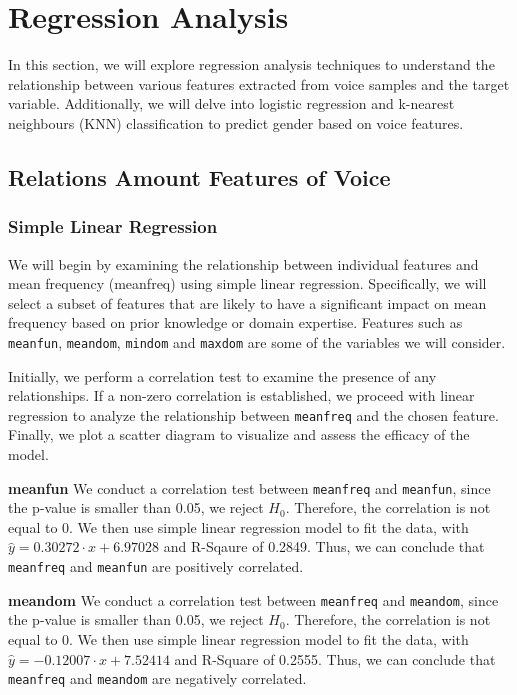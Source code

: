 \documentclass{article}
\begin{document}
	\section{Regression Analysis}
	
	In this section, we will explore regression analysis techniques to understand the relationship between various features extracted from voice samples and the target variable. Additionally, we will delve into logistic regression and k-nearest neighbours (KNN) classification to predict gender based on voice features.
	
	\subsection{Relations Amount Features of Voice}
	
	\subsubsection{Simple Linear Regression}
	We will begin by examining the relationship between individual features and mean frequency (meanfreq) using simple linear regression. Specifically, we will select a subset of features that are likely to have a significant impact on mean frequency based on prior knowledge or domain expertise. Features such as \texttt{meanfun}, \texttt{meandom}, \texttt{mindom} and \texttt{maxdom} are some of the variables we will consider.
	
	Initially, we perform a correlation test to examine the presence of any relationships. If a non-zero correlation is established, we proceed with linear regression to analyze the relationship between \texttt{meanfreq} and the chosen feature. Finally, we plot a scatter diagram to visualize and assess the efficacy of the model.
	
	\textbf{meanfun} We conduct a correlation test between \texttt{meanfreq} and \texttt{meanfun}, since the p-value is smaller than 0.05, we reject $H_0$. Therefore, the correlation is not equal to 0. We then use simple linear regression model to fit the data, with $\hat{y}=0.30272\cdot x + 6.97028$ and R-Sqaure of 0.2849. Thus, we can conclude that \texttt{meanfreq} and \texttt{meanfun} are positively correlated.
	
	\textbf{meandom} We conduct a correlation test between \texttt{meanfreq} and \texttt{meandom}, since the p-value is smaller than 0.05, we reject $H_0$. Therefore, the correlation is not equal to 0. We then use simple linear regression model to fit the data, with $\hat{y}=-0.12007\cdot x + 7.52414$ and R-Square of 0.2555. Thus, we can conclude that \texttt{meanfreq} and \texttt{meandom} are negatively correlated.
	
\end{document}
